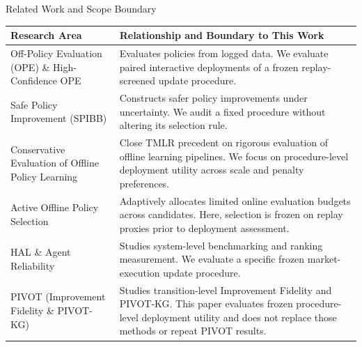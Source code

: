 \documentclass[10pt,aspectratio=169]{beamer}
\begin{document}
\begin{frame}{Related Work and Scope Boundary}
  \scriptsize
  \renewcommand{\arraystretch}{1.12}
  \begin{tabular}{@{}p{}p{}@{}}
    \toprule
    \textbf{Research Area} & \textbf{Relationship and Boundary to This Work} \\
    \midrule
    Off-Policy Evaluation (OPE) \& High-Confidence OPE & Evaluates policies from logged data. We evaluate paired interactive deployments of a frozen replay-screened update procedure. \\
    \addlinespace[0.3em]
    Safe Policy Improvement (SPIBB) & Constructs safer policy improvements under uncertainty. We audit a fixed procedure without altering its selection rule. \\
    \addlinespace[0.3em]
    Conservative Evaluation of Offline Policy Learning & Close TMLR precedent on rigorous evaluation of offline learning pipelines. We focus on procedure-level deployment utility across scale and penalty preferences. \\
    \addlinespace[0.3em]
    Active Offline Policy Selection & Adaptively allocates limited online evaluation budgets across candidates. Here, selection is frozen on replay proxies prior to deployment assessment. \\
    \addlinespace[0.3em]
    HAL \& Agent Reliability & Studies system-level benchmarking and ranking measurement. We evaluate a specific frozen market-execution update procedure. \\
    \addlinespace[0.3em]
    PIVOT (Improvement Fidelity \& PIVOT-KG) & Studies transition-level Improvement Fidelity and PIVOT-KG. This paper evaluates frozen procedure-level deployment utility and does not replace those methods or repeat PIVOT results. \\
    \bottomrule
  \end{tabular}
\end{frame}
\end{document}
